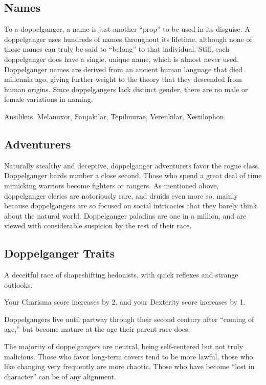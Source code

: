 \subsection{Names}
{To a doppelganger, a name is just another “prop” to be used in its disguise. A doppelganger uses hundreds of names throughout its lifetime, although none of those names can truly be said to “belong” to that individual. Still, each doppelganger does have a single, unique name, which is almost never used. Doppelganger names are derived from an ancient human language that died millennia ago, giving further weight to the theory that they descended from human origins. Since doppelgangers lack distinct gender, there are no male or female variations in naming.}

{Ansilikus, Melanuxor, Sanjakilar, Tepilmurae, Verenkilar, Xestilophon.}

\subsection{Adventurers}
{Naturally stealthy and deceptive, doppelganger adventurers favor the rogue class. Doppelganger bards number a close second. Those who spend a great deal of time mimicking warriors become fighters or rangers. As mentioned above, doppelganger clerics are notoriously rare, and druids even more so, mainly because doppelgangers are so focused on social intricacies that they barely think about the natural world. Doppelganger paladins are one in a million, and are viewed with considerable suspicion by the rest of their race.}

\subsection{Doppelganger Traits}
A deceitful race of shapeshifting hedonists, with quick reflexes and strange outlooks.

{Your Charisma score increases by 2, and your Dexterity score increases by 1.}

{Doppelgangers live until partway through their second century after “coming of age,” but become mature at the age their parent race does.}

{The majority of doppelgangers are neutral, being self-centered but not truly malicious. Those who favor long-term covers tend to be more lawful, those who like changing very frequently are more chaotic. Those who have become “lost in character” can be of any alignment.}

